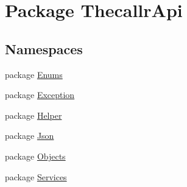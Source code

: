 \hypertarget{namespace_thecallr_api}{\section{Package Thecallr\+Api}
\label{namespace_thecallr_api}
}
\subsection*{Namespaces}
\begin{DoxyCompactItemize}
\item 
package \hyperlink{namespace_thecallr_api_1_1_enums}{Enums}
\item 
package \hyperlink{namespace_thecallr_api_1_1_exception}{Exception}
\item 
package \hyperlink{namespace_thecallr_api_1_1_helper}{Helper}
\item 
package \hyperlink{namespace_thecallr_api_1_1_json}{Json}
\item 
package \hyperlink{namespace_thecallr_api_1_1_objects}{Objects}
\item 
package \hyperlink{namespace_thecallr_api_1_1_services}{Services}
\end{DoxyCompactItemize}
